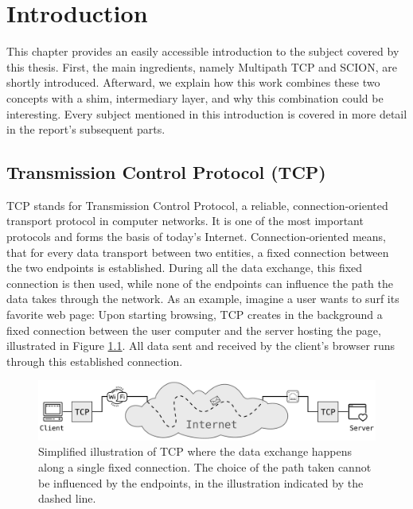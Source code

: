 \newcommand{\package}{\emph}

\chapter{Introduction}
\label{chap:Introduction}

This chapter provides an easily accessible introduction to the subject covered by this thesis.  First, the main ingredients, namely Multipath TCP and SCION, are shortly introduced. Afterward, we explain how this work combines these two concepts with a shim, intermediary layer, and why this combination could be interesting. Every subject mentioned in this introduction is covered in more detail in the report's subsequent parts.

\section{Transmission Control Protocol (TCP)}

TCP stands for Transmission Control Protocol, a reliable, connection-oriented transport protocol in computer networks. It is one of the most important protocols and forms the basis of today's Internet. Connection-oriented means, that for every data transport between two entities, a fixed connection between the two endpoints is established. During all the data exchange, this fixed connection is then used, while none of the endpoints can influence the path the data takes through the network. As an example, imagine a user wants to surf its favorite web page: Upon starting browsing, TCP creates in the background a fixed connection between the user computer and the server hosting the page, illustrated in Figure \ref{fig:IntroTCP}. All data sent and received by the client's browser runs through this established connection.

\newpage

\begin{figure}[H]
	\begin{center}
		\def\svgwidth{1\textwidth}
		\includegraphics[scale=0.28]{../illustrations/introduction/TCPConnection.pdf}  
		\caption[]{Simplified illustration of TCP where the data exchange happens along a single fixed connection. The choice of the path taken cannot be influenced by the endpoints, in the illustration indicated by the dashed line.}
		\label{fig:IntroTCP}
	\end{center}
\end{figure}

